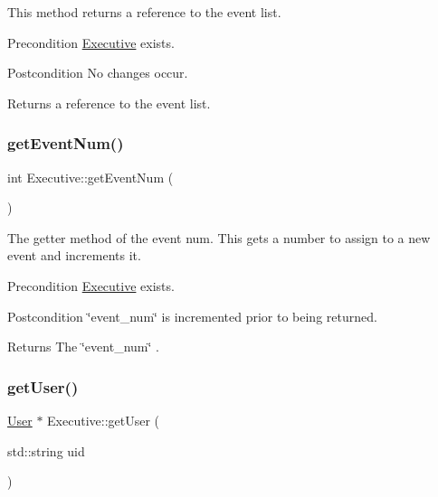 This method returns a reference to the event list. \begin{DoxyPrecond}{Precondition}
\mbox{\hyperlink{class_executive}{Executive}} exists. 
\end{DoxyPrecond}
\begin{DoxyPostcond}{Postcondition}
No changes occur. 
\end{DoxyPostcond}
\begin{DoxyReturn}{Returns}
a reference to the event list. 
\end{DoxyReturn}
\mbox{\label{class_executive_abd540db75256c14b7fe16d59c0e00d48}} 
\subsubsection{\texorpdfstring{get\+Event\+Num()}{getEventNum()}}
{\footnotesize\ttfamily int Executive\+::get\+Event\+Num (\begin{DoxyParamCaption}{ }\end{DoxyParamCaption})}

The getter method of the event num. This gets a number to assign to a new event and increments it. \begin{DoxyPrecond}{Precondition}
\mbox{\hyperlink{class_executive}{Executive}} exists. 
\end{DoxyPrecond}
\begin{DoxyPostcond}{Postcondition}
\char`\"{}event\+\_\+num\char`\"{} is incremented prior to being returned. 
\end{DoxyPostcond}
\begin{DoxyReturn}{Returns}
The \char`\"{}event\+\_\+num\char`\"{} . 
\end{DoxyReturn}
\mbox{\label{class_executive_adbf182bb09881e5a7ab01689fd653afd}} 
\subsubsection{\texorpdfstring{get\+User()}{getUser()}}
{\footnotesize\ttfamily \mbox{\hyperlink{class_user}{User}} $\ast$ Executive\+::get\+User (\begin{DoxyParamCaption}\item[{std\+::string}]{uid }\end{DoxyParamCaption})}

